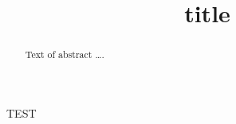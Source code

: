 \documentclass[pacmpl, screen, review,anonymous, timestamp]{acmart}
\title[title]{title}
\begin{document}
\begin{abstract}
Text of abstract \ldots.
\end{abstract}

\maketitle

TEST

%
\end{document}
